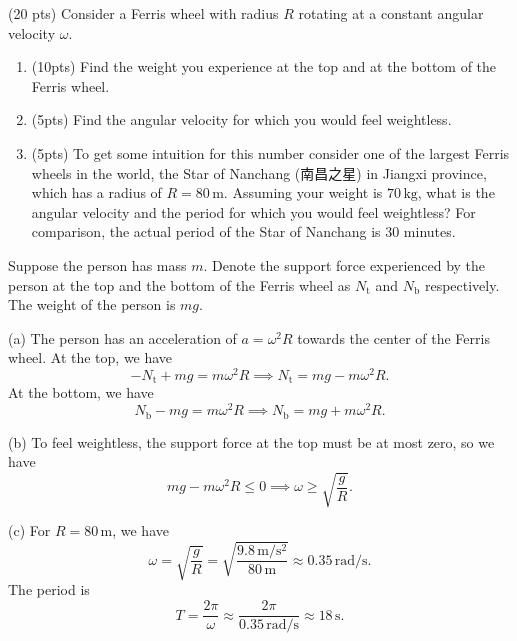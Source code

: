 \documentclass{article}
\begin{document}
\begin{problem}
    (20 pts) Consider a Ferris wheel with radius \( R \) rotating at a constant angular velocity \( \omega \).
    \begin{enumerate}[label=(\alph*)]
        \item (10pts) Find the weight you experience at the top and at the bottom of the Ferris wheel.
        \item (5pts) Find the angular velocity for which you would feel weightless.
        \item (5pts) To get some intuition for this number consider one of the largest Ferris wheels in the world, the Star of Nanchang (南昌之星) in Jiangxi province, which has a radius of \( R = 80 \, \text{m} \). Assuming your weight is \( 70 \, \text{kg} \), what is the angular velocity and the period for which you would feel weightless? For comparison, the actual period of the Star of Nanchang is 30 minutes.
    \end{enumerate}
\end{problem}

\begin{solution}
    Suppose the person has mass \( m \). Denote the support force experienced by the person at the top and the bottom of the Ferris wheel as \( N_{\text{t}} \) and \( N_{\text{b}} \) respectively. The weight of the person is \( mg \).\par
    (a) The person has an acceleration of \( a = \omega^2 R \) towards the center of the Ferris wheel. At the top, we have
    \[ -N_{\text{t}} + mg = m \omega^2 R \implies N_{\text{t}} = mg - m\omega^2 R . \]
    At the bottom, we have
    \[ N_{\text{b}} - mg = m \omega^2 R \implies N_{\text{b}} = mg+ m\omega^2 R. \]\par
    (b) To feel weightless, the support force at the top must be at most zero, so we have
    \[ mg - m\omega^2 R \leq 0 \implies \omega \ge \sqrt{\frac{g}{R}}. \]\par
    (c) For \( R = 80 \, \text{m} \), we have
    \[ \omega = \sqrt{\frac{g}{R}} = \sqrt{\frac{9.8\,\text{m}/\text{s}^2}{80\,\text{m}}} \approx 0.35 \, \text{rad/s}. \] The period is
    \[ T = \frac{2\pi}{\omega} \approx \frac{2\pi}{0.35\, \text{rad/s}} \approx 18 \, \text{s}. \] 
\end{solution}
\end{document}
